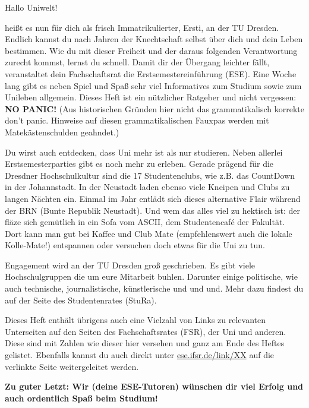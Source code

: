 
Hallo Uniwelt!

heißt es nun für dich als frisch Immatrikulierter, Ersti, an der TU Dresden. 
Endlich kannst du nach Jahren der Knechtschaft selbst über dich und dein Leben bestimmen. 
Wie du mit dieser Freiheit und der daraus folgenden Verantwortung zurecht kommst, lernst du schnell. 
Damit dir der Übergang leichter fällt, veranstaltet dein Fachschaftsrat die Erstsemestereinführung (ESE). 
Eine Woche lang gibt es neben Spiel und Spaß sehr viel Informatives zum Studium sowie zum Unileben allgemein. 
Dieses Heft ist ein nützlicher Ratgeber und nicht vergessen: 
\textbf{NO PANIC!} (Aus historischen Gründen hier nicht das grammatikalisch korrekte \glqq don't panic\grqq. Hinweise auf diesen grammatikalischen Fauxpas werden mit Matekästenschulden geahndet.)

Du wirst auch entdecken, dass Uni mehr ist als nur studieren. 
Neben allerlei Erstsemesterparties gibt es noch mehr zu erleben. 
Gerade prägend für die Dresdner Hochschulkultur sind die 17 Studentenclubs, wie z.B. das CountDown in der Johannstadt. 
In der Neustadt laden ebenso viele Kneipen und Clubs zu langen Nächten ein. 
Einmal im Jahr entlädt sich dieses alternative Flair während der BRN (Bunte Republik Neustadt). 
Und wem das alles viel zu hektisch ist: der fläze sich gemütlich in ein Sofa vom ASCII, dem Studentencafé der Fakultät. 
Dort kann man gut bei Kaffee und Club Mate (empfehlenswert auch die lokale Kolle-Mate!) entspannen oder versuchen doch etwas für die Uni zu tun.

Engagement wird an der TU Dresden groß geschrieben. 
Es gibt viele Hochschulgruppen die um eure Mitarbeit buhlen. 
Darunter einige politische, wie auch technische, journalistische, künstlerische und und und. Mehr dazu findest du auf der Seite des Studentenrates (StuRa).

Dieses Heft enthält übrigens auch eine Vielzahl von Links zu relevanten Unterseiten auf den Seiten des Fachschaftsrates (FSR), der Uni und anderen. 
Diese sind mit Zahlen wie dieser hier  versehen und ganz am Ende des Heftes gelistet. Ebenfalls kannst du auch direkt unter \url{ese.ifsr.de/link/XX} auf die verlinkte Seite weitergeleitet werden.

\textbf{Zu guter Letzt: Wir (deine ESE-Tutoren) wünschen dir viel Erfolg und auch ordentlich Spaß beim Studium!}

